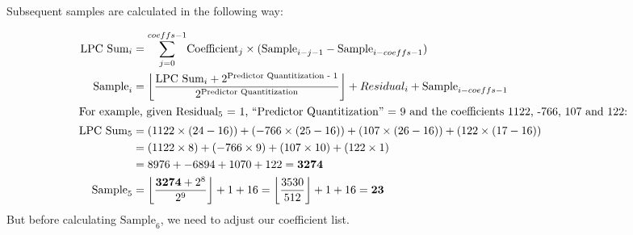 Subsequent samples are calculated in the following way:

\begin{align*}
\text{LPC Sum}_i &= \overset{coeffs - 1}{\underset{j = 0}{\sum}}
\text{Coefficient}_j \times (\text{Sample}_{i - j - 1} - \text{Sample}_{i - coeffs - 1}) \\
\text{Sample}_i &= \left\lfloor \frac{\text{LPC Sum}_i + 2^{\text{Predictor Quantitization - 1}}} {2 ^ \text{Predictor Quantitization}}\right\rfloor + Residual_i + \text{Sample}_{i - coeffs - 1} \\
\intertext{For example, given $\text{Residual}_5$ = 1,
``{Predictor Quantitization}'' = 9
and the coefficients 1122, -766, 107 and 122:}
\text{LPC Sum}_5 &=
(1122 \times (24 - 16)) + (-766 \times (25 - 16)) +
 (107 \times (26 - 16)) + (122 \times (17 - 16)) \\
&= (1122 \times 8) + (-766 \times 9) + (107 \times 10) + (122 \times 1) \\
&= 8976 + -6894 + 1070 + 122 = \textbf{3274} \\
\text{Sample}_5 &= \left\lfloor\frac{\textbf{3274} + 2^8}{2^9}\right\rfloor + 1 + 16
= \left\lfloor\frac{3530}{512}\right\rfloor + 1 + 16 = \textbf{23}
\end{align*}
But before calculating $\text{Sample}_6$,
we need to adjust our coefficient list.

\clearpage

